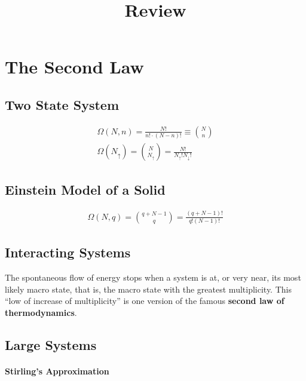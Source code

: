 \documentclass[12pt]{article}
\title{Review}
\begin{document}
\maketitle
\newpage
\tableofcontents
\newpage
{}

\section{The Second Law}%
\label{sec:the_second_law}

\subsection{Two State System}%
\label{sub:two_state_system}

\begin{align}
  \Omega(N,n) = \frac{N!}{n!\cdot(N-n)!}\equiv{N \choose n}\\
  \Omega\left(N_{\uparrow}\right)={N\choose
  N_{\uparrow}}=\frac{N!}{N_\uparrow!N_\downarrow!}
\end{align}

\subsection{Einstein Model of a Solid}%
\label{sub:einstein_model_of_a_solid}

\begin{align}
  \Omega(N,q)={q+N-1 \choose q} = \frac{(q+N-1)!}{q!(N-1)!}
\end{align}

\subsection{Interacting Systems}%
\label{sub:interacting_systems}

The spontaneous flow of energy stops when a system is at, or very near, its
most likely macro state, that is, the macro state with the greatest multiplicity.
This ``low of increase of multiplicity'' is one version of the famous
\textbf{second law of thermodynamics}.

\subsection{Large Systems}%
\label{sub:large_systems}

\paragraph{Stirling's Approximation}%
\label{par:stirling_s_approximation}
\end{document}
